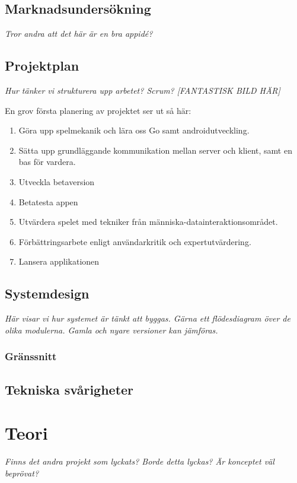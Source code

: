 \documentclass[11pt,a4paper]{article}
\begin{document}
\subsection{Marknadsundersökning}
\textit{Tror andra att det här är en bra appidé?}

\subsection{Projektplan}

\textit{Hur tänker vi strukturera upp arbetet? Scrum?
[FANTASTISK BILD HÄR]}

En grov första planering av projektet ser ut så här:
\begin{enumerate}
\item Göra upp spelmekanik och lära oss Go samt androidutveckling.
\item Sätta upp grundläggande kommunikation mellan server och klient, samt en bas för vardera.
\item Utveckla betaversion
\item Betatesta appen
\item Utvärdera spelet med tekniker från människa-datainteraktionsområdet.
\item Förbättringsarbete enligt användarkritik och expertutvärdering.
\item Lansera applikationen
\end{enumerate}

\subsection{Systemdesign}
\textit{Här visar vi hur systemet är tänkt att byggas. Gärna ett flödesdiagram över de olika modulerna. Gamla och nyare versioner kan jämföras.}

\subsubsection{Gränssnitt}

\subsection{Tekniska svårigheter}

\section{Teori}
\textit{Finns det andra projekt som lyckats? Borde detta lyckas? Är konceptet väl beprövat?}
\end{document}
